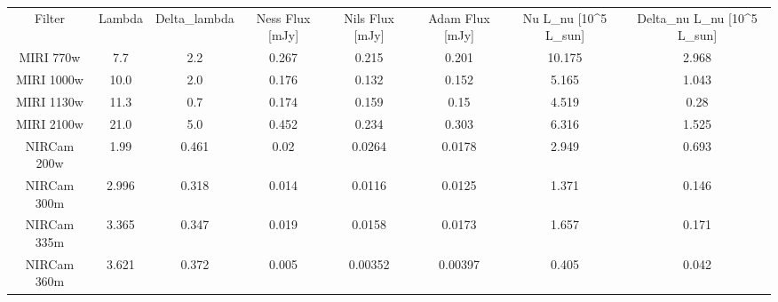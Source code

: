 \begin{table}
\begin{tabular}{cccccccc}
Filter & Lambda & Delta_lambda & Ness Flux [mJy] & Nils Flux [mJy] & Adam Flux [mJy] & Nu L_nu [10^5 L_sun] & Delta_nu L_nu [10^5 L_sun] \\
MIRI 770w & 7.7 & 2.2 & 0.267 & 0.215 & 0.201 & 10.175 & 2.968 \\
MIRI 1000w & 10.0 & 2.0 & 0.176 & 0.132 & 0.152 & 5.165 & 1.043 \\
MIRI 1130w & 11.3 & 0.7 & 0.174 & 0.159 & 0.15 & 4.519 & 0.28 \\
MIRI 2100w & 21.0 & 5.0 & 0.452 & 0.234 & 0.303 & 6.316 & 1.525 \\
NIRCam 200w & 1.99 & 0.461 & 0.02 & 0.0264 & 0.0178 & 2.949 & 0.693 \\
NIRCam 300m & 2.996 & 0.318 & 0.014 & 0.0116 & 0.0125 & 1.371 & 0.146 \\
NIRCam 335m & 3.365 & 0.347 & 0.019 & 0.0158 & 0.0173 & 1.657 & 0.171 \\
NIRCam 360m & 3.621 & 0.372 & 0.005 & 0.00352 & 0.00397 & 0.405 & 0.042 \\
\end{tabular}
\end{table}
